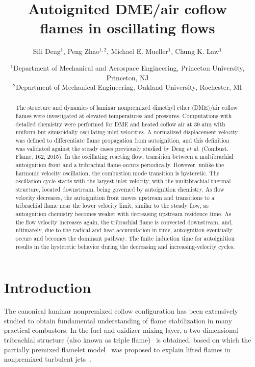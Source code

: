 \documentclass{essci}
\begin{document}
\title{ Autoignited DME/air coflow flames in oscillating flows }
\author{
%
Sili Deng$^1$, Peng Zhao$^{1,2}$, Michael E. Mueller$^1$, Chung K. Law$^1$
%
}
\date{
%
$^1$Department of Mechanical and Aerospace Engineering, Princeton University, Princeton, NJ \\
$^2$Department of Mechanical Engineering, Oakland University, Rochester, MI
%
}
\maketitle

\begin{abstract}
The structure and dynamics of laminar nonpremixed dimethyl ether (DME)/air coflow flames were investigated at elevated temperatures and pressures. Computations with detailed chemistry were performed for DME and heated coflow air at 30 atm with uniform but sinusoidally oscillating inlet velocities. A normalized displacement velocity was defined to differentiate flame propagation from autoignition, and this definition was validated against the steady cases previously studied by Deng \emph{et al.} (Combust. Flame, 162, 2015). In the oscillating reacting flow, transition between a multibrachial autoignition front and a tribrachial flame occurs periodically. However, unlike the harmonic velocity oscillation, the combustion mode transition is hysteretic. The oscillation cycle starts with the largest inlet velocity, with the multibrachial thermal structure, located downstream, being governed by autoignition chemistry. As flow velocity decreases, the autoignition front moves upstream and transitions to a tribrachial flame near the lower velocity limit, similar to the steady flow, as autoignition chemistry becomes weaker with decreasing upstream residence time. As the flow velocity increases again, the tribrachial flame is convected downstream, and, ultimately, due to the radical and heat accumulation in time, autoignition eventually occurs and becomes the dominant pathway. The finite induction time for autoignition results in the hysteretic behavior during the decreasing and increasing-velocity cycles.
\end{abstract}


\section{Introduction}

The canonical laminar nonpremixed coflow configuration has been extensively studied to obtain fundamental understanding of flame stabilization in many practical combustors.  In the fuel and oxidizer mixing layer, a two-dimensional tribrachial structure (also known as triple flame)~\cite{buckmaster02} is obtained, based on which the partially premixed flamelet model~\cite{muller94} was proposed to explain lifted flames in nonpremixed turbulent jets~\cite{chung07}.
\end{document}
